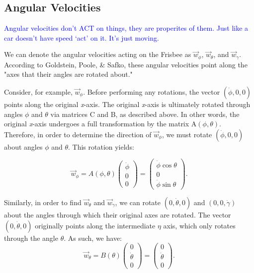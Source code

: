 \documentclass[a4paper,12pt, oneside]{article}
\newcommand{\blue}[1]{\textcolor{blue}{#1}}
\begin{document}
\subsection{Angular Velocities}

\blue{Angular velocities don't ACT on things, they are properites of them. Just like a car doesn't have speed `act' on it. It's just moving.}

We can denote the angular velocities acting on the Frisbee as $\vec{w}_\phi$, $\vec{w}_\theta$, and $\vec{w}_\gamma$.  According to Goldstein, Poole, \& Safko, these angular velocities point along the "axes that their angles are rotated about."

Consider, for example, $\vec{w}_\phi$.  Before performing any rotations, the vector $(\dot\phi, 0, 0)$ points along the original \textit{x}-axis.  The original \textit{x}-axis is ultimately rotated through angles $\phi$ and $\theta$ via matrices C and B, as described above. In other words, the original \textit{x}-axis undergoes a full transformation by the matrix A$(\phi,\theta)$. Therefore, in order to determine the direction of $\vec{w}_\phi$, we must rotate $(\dot\phi, 0, 0)$ about angles $\phi$ and $\theta$.  This rotation yields:

\begin{equation*}
\vec{w}_\phi=A(\phi,\theta)\left(\begin{array}{ccc}\dot\phi\\0\\0\end{array} \right)=\left(\begin{array}{ccc}\dot\phi\cos\theta\\0\\\dot\phi\sin\theta\end{array} \right).
\end{equation*}

Similarly, in order to find $\vec{w}_\theta$ and $\vec{w}_\gamma$, we can rotate $(0, \dot\theta, 0)$ and $(0, 0, \dot\gamma)$ about the angles through which their original axes are rotated. The vector $(0, \dot\theta, 0)$ originally points along the intermediate $\eta$ axis, which only rotates through the angle $\theta$. As such, we have:
\begin{equation*}
  \vec{w}_\theta=B(\theta)\left(\begin{array}{ccc}
    0\\
    \dot\theta \\
    0
  \end{array} 
  \right)=\left(\begin{array}{ccc}
    0 \\ 
    \dot\theta \\
    0
  \end{array}\right).
\end{equation*}
\end{document}
